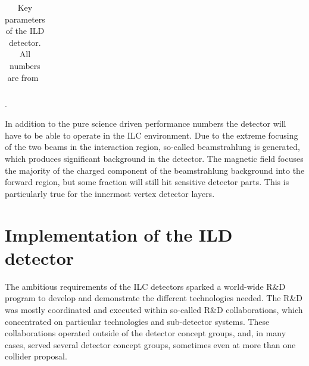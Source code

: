 \documentclass[%
 amsmath,amssymb,
 aps,
]{revtex4-1}
\newcommand{\bottomrule}{\hline}
\begin{document}
\begin{table}[th]
\begin{tabular}{|l|l|c|c|p{4cm}|}
        
\bottomrule
    \end{tabular}
    \caption{Key parameters of the ILD detector. All numbers are from~\cite{Behnke:2013lya}}.
    \label{ild:tab:barrelpara}
\end{table}


In addition to the pure science driven performance numbers the detector will have to be able to operate in the ILC environment. Due to the extreme focusing of the two beams in the interaction region, so-called beamstrahlung is generated, which produces significant background in the detector. The magnetic field focuses the majority of the charged component of the beamstrahlung background into the forward region, but some fraction will still hit sensitive detector parts. This is particularly true for the innermost vertex detector layers.


\section{Implementation of the ILD detector}
The ambitious requirements of the ILC detectors sparked a world-wide R\&D program to develop and demonstrate the different technologies needed. The R\&D was mostly coordinated and executed within so-called R\&D collaborations, which concentrated on particular technologies and sub-detector systems. These collaborations operated outside of the detector concept groups, and, in many cases, served several detector concept groups, sometimes even at more than one collider proposal. 
\end{document}
